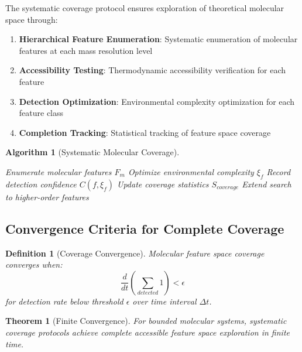 \documentclass[11pt,a4paper]{article}
\newtheorem{theorem}{Theorem}
\newtheorem{definition}{Definition}
\newtheorem{algorithm_def}{Algorithm}
\begin{document}
The systematic coverage protocol ensures exploration of theoretical molecular space through:

\begin{enumerate}
\item \textbf{Hierarchical Feature Enumeration}: Systematic enumeration of molecular features at each mass resolution level
\item \textbf{Accessibility Testing}: Thermodynamic accessibility verification for each feature
\item \textbf{Detection Optimization}: Environmental complexity optimization for each feature class
\item \textbf{Completion Tracking}: Statistical tracking of feature space coverage
\end{enumerate}

\begin{algorithm_def}[Systematic Molecular Coverage]
\begin{algorithmic}
    \STATE Enumerate molecular features $F_m$
            \STATE Optimize environmental complexity $\xi_f$
            \STATE Record detection confidence $C(f, \xi_f)$
        \ENDIF
        \STATE Update coverage statistics $S_{coverage}$
    \ENDFOR
        \STATE Extend search to higher-order features
    \ENDIF
\ENDFOR
\end{algorithmic}
\end{algorithm_def}

\subsection{Convergence Criteria for Complete Coverage}

\begin{definition}[Coverage Convergence]
Molecular feature space coverage converges when:
\begin{equation}
\frac{d}{dt}\left(\sum_{detected} 1\right) < \epsilon
\end{equation}
for detection rate below threshold $\epsilon$ over time interval $\Delta t$.
\end{definition}

\begin{theorem}[Finite Convergence]
For bounded molecular systems, systematic coverage protocols achieve complete accessible feature space exploration in finite time.
\end{theorem}
\end{document}
